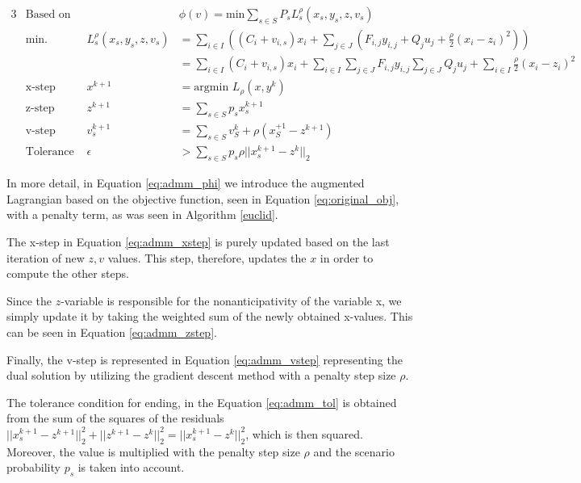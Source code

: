 \documentclass[a4paper]{artikel3}
\begin{document}
\begin{alignat}{3}
	&\text{Based on}& &\phi (v)= \text{min} \sum_{s \in S} P_s L_s^{\rho} (x_s, y_s, z, v_s)\label{eq:admm_phi} \\
	&\text{min. } & L_s^{\rho} (x_s, y_s, z, v_s) &= \sum_{i \in I}( (C_i+v_{i,s})x_i + \sum_{j \in J} (F_{i,j} y_{i,j} + Q_{j} u_j + \frac{\rho}{2}(x_i-z_i)^2 ) ) \label{eq:admm_obj} \\
	&&&=\sum_{i \in I} (C_i+v_{i,s})x_i +\sum_{i \in I} \sum_{j \in J} F_{i,j} y_{i,j}   \sum_{j \in J}  Q_{j} u_j+ \sum_{i \in I} \frac{\rho}{2}(x_i-z_i)^2 \\
	&\text{x-step } &  x^{k+1} &= \text{argmin } L_{\rho} (x, y^k) \label{eq:admm_xstep} \\
	&\text{z-step } & z^{k+1} &= \sum_{s \in S} p_s x_s^{k+1}  \label{eq:admm_zstep}\\
	&\text{v-step } & v_s^{k+1} &= \sum_{s \in S} v_S^k + \rho (x_S^{+1} - z^{k+1})  \label{eq:admm_vstep} \\
	&\text{Tolerance } & \epsilon &> \sum_{s \in S} p_s \rho || x_s^{k+1} - z^k||_2  \label{eq:admm_tol}
\end{alignat}

In more detail, in Equation \ref{eq:admm_phi} we introduce the augmented Lagrangian based on the objective function, seen in Equation \ref{eq:original_obj}, with a penalty term, as was seen in Algorithm \ref{euclid}.


The x-step in Equation \ref{eq:admm_xstep} is purely updated based on the last iteration of new $z,v$ values. This step, therefore, updates the $x$ in order to compute the other steps.

Since the $z$-variable is responsible for the nonanticipativity of the variable x, we simply update it by taking the weighted sum of the newly obtained x-values. This can be seen in Equation \ref{eq:admm_zstep}.

Finally, the v-step is represented in Equation \ref{eq:admm_vstep} representing the dual solution by utilizing the gradient descent method with a penalty step size $\rho$.

The tolerance condition for ending, in the Equation \ref{eq:admm_tol} is obtained from the sum of the squares of the residuals $|| x_s^{k+1} - z^{k+1}||_2^2 + ||z^{k+1}-z^k||^2_2 = ||x_s^{k+1}-z^k||_2^2$, which is then squared. Moreover, the value is multiplied with the penalty step size $\rho$ and the scenario probability $p_s$ is taken into account.


\end{document}
